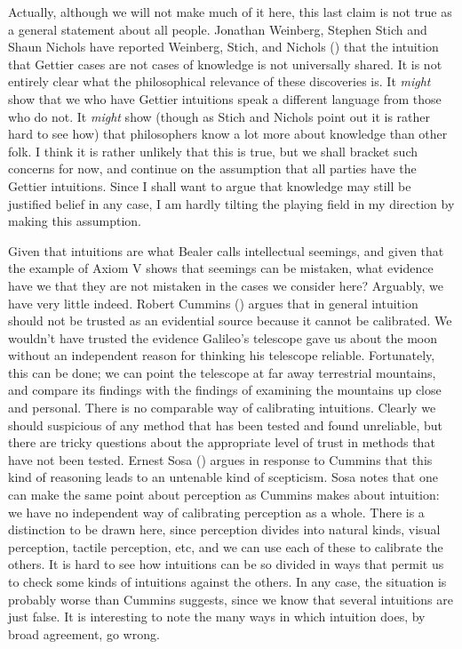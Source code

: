 \documentclass[
  10pt,
  letterpaper,
  DIV=11,
  numbers=noendperiod,
  twoside]{scrartcl}
\begin{document}
Actually, although we will not make much of it here, this last claim is
not true as a general statement about all people. Jonathan Weinberg,
Stephen Stich and Shaun Nichols have reported Weinberg, Stich, and
Nichols () that the intuition that
Gettier cases are not cases of knowledge is not universally shared. It
is not entirely clear what the philosophical relevance of these
discoveries is. It \emph{might} show that we who have Gettier intuitions
speak a different language from those who do not. It \emph{might} show
(though as Stich and Nichols point out it is rather hard to see how)
that philosophers know a lot more about knowledge than other folk. I
think it is rather unlikely that this is true, but we shall bracket such
concerns for now, and continue on the assumption that all parties have
the Gettier intuitions. Since I shall want to argue that knowledge may
still be justified belief in any case, I am hardly tilting the playing
field in my direction by making this assumption.

Given that intuitions are what Bealer calls intellectual seemings, and
given that the example of Axiom V shows that seemings can be mistaken,
what evidence have we that they are not mistaken in the cases we
consider here? Arguably, we have very little indeed. Robert Cummins
() argues that in general intuition
should not be trusted as an evidential source because it cannot be
calibrated. We wouldn't have trusted the evidence Galileo's telescope
gave us about the moon without an independent reason for thinking his
telescope reliable. Fortunately, this can be done; we can point the
telescope at far away terrestrial mountains, and compare its findings
with the findings of examining the mountains up close and personal.
There is no comparable way of calibrating intuitions. Clearly we should
suspicious of any method that has been tested and found unreliable, but
there are tricky questions about the appropriate level of trust in
methods that have not been tested. Ernest Sosa
() argues in response to Cummins that this
kind of reasoning leads to an untenable kind of scepticism. Sosa notes
that one can make the same point about perception as Cummins makes about
intuition: we have no independent way of calibrating perception as a
whole. There is a distinction to be drawn here, since perception divides
into natural kinds, visual perception, tactile perception, etc, and we
can use each of these to calibrate the others. It is hard to see how
intuitions can be so divided in ways that permit us to check some kinds
of intuitions against the others. In any case, the situation is probably
worse than Cummins suggests, since we know that several intuitions are
just false. It is interesting to note the many ways in which intuition
does, by broad agreement, go wrong.
\end{document}
